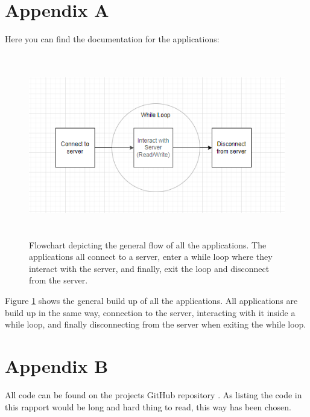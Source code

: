 \documentclass[11pt, A4paper, english]{article}
\begin{document}
\printbibliography
	
	\section{Appendix A}
Here you can find the documentation for the applications: \\
		\begin{figure}[H]
\includegraphics[width=12.8cm, height=8cm]{Flowchart.png}
\caption{Flowchart depicting the general flow of all the applications. The applications all connect to a server, enter a while loop where they interact with the server, and finally, exit the loop and disconnect from the server.}
\label{im:flow}
		\end{figure}
Figure \ref{im:flow} shows the general build up of all the applications. All applications are build up in the same way, connection to the server, interacting with it inside a while loop, and finally disconnecting from the server when exiting the while loop.

	\section{Appendix B}
All code can be found on the projects GitHub repository \cite{github}. As listing the code in this rapport would be long and hard thing to read, this way has been chosen.
\end{document}
